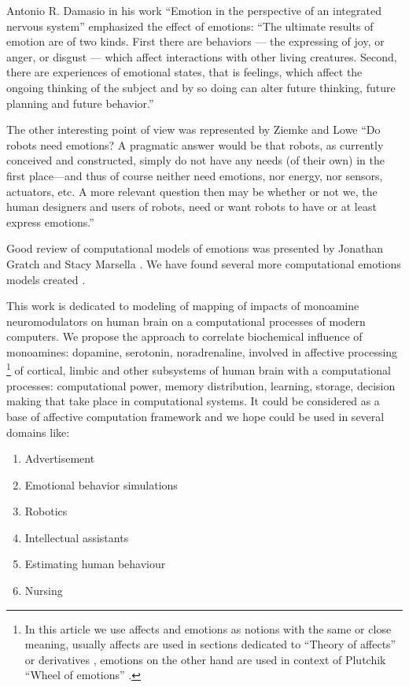 Antonio R. Damasio in his work ``Emotion in the perspective of an integrated nervous system'' \cite{emotionInPerspectiveOfIntegratedNervousSystem} emphasized the effect of emotions: ``The ultimate results of emotion are of two kinds. First there are behaviors — the expressing of joy, or anger, or disgust — which affect interactions with other living creatures. Second, there are experiences of emotional states, that is feelings, which affect the ongoing thinking of the subject and by so doing can alter future thinking, future planning and future behavior.''

The other interesting point of view was represented by Ziemke and Lowe \cite{on_role_of_emotion, emotionsbraintorobot} ``Do robots need emotions? A pragmatic answer would be that robots, as currently conceived and constructed, simply do not have any needs (of their own) in the first place—and thus of course neither need emotions, nor energy, nor sensors, actuators, etc. A more relevant question then may be whether or not we, the human designers and users of robots, need or want robots to have or at least express emotions.''

Good review of computational models of emotions was presented by Jonathan Gratch and Stacy Marsella \cite{evaluatingcomutationalmodel, computationalmodelsemotion}. We have found several more computational emotions models created \cite{computationalmodelsemotion, computationalmodelsemotionscognition, evaluatingcomutationalmodel, threelevel}.

This work is dedicated to modeling of mapping of impacts of monoamine neuromodulators on human brain on a computational processes of modern computers. We propose the approach to correlate biochemical influence of monoamines: dopamine, serotonin, noradrenaline, involved in affective processing \footnote{In this article we use affects and emotions as notions with the same or close meaning, usually affects are used in sections dedicated to ``Theory of affects'' \cite{tomkins1, tomkins2, tomkins3} or derivatives \cite{cubeofemotions}, emotions on the other hand are used in context of Plutchik ``Wheel of emotions'' \cite{natureofemotions}.} of cortical, limbic and other subsystems of human brain with a computational processes: computational power, memory distribution, learning, storage, decision making that take place in computational systems. It could be considered as a base of affective computation framework and we hope could be used in several domains like:

\begin{enumerate}
 \item  Advertisement
 \item  Emotional behavior simulations
 \item  Robotics
 \item  Intellectual assistants
 \item  Estimating human behaviour
 \item  Nursing
\end{enumerate}

